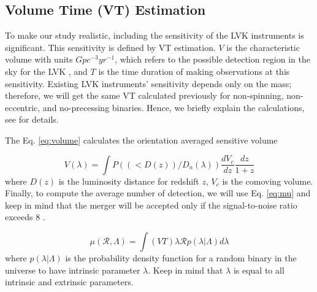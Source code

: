 \documentclass[twocolumn,prd,nofootinbib]{revtex4}
\begin{document}

\subsection{Volume Time (VT) Estimation}

To make our study realistic, including the sensitivity of the LVK instruments is significant. This sensitivity is defined by VT estimation. $V$ is the characteristic volume with units $Gpc^{-3}yr^{-1}$, which refers to the possible detection region in the sky for the LVK \cite{Volume_1993}, and $T$ is the time duration of making observations at this sensitivity.
Existing LVK instruments' sensitivity depends only on the mass; therefore, we will get the same VT calculated previously \cite{Dan_2019} for non-spinning, non-eccentric, and no-precessing binaries. Hence, we briefly explain the calculations, see \cite{Dan_2019} for details.

The Eq. \ref{eq:volume} calculates the orientation averaged sensitive volume \cite{Abbott_2016,richard2010volume}

\begin{equation}
\label{eq:volume}
V(\lambda) = \int P((<D(z))/D_n(\lambda))\frac{dV_c}{dz}\frac{dz}{1+z}
\end{equation}    
where $D(z)$ is the luminosity distance for redshift $z$, $V_c$ is the comoving volume. Finally, to compute the average number of detection, we will use Eq. \ref{eq:mu} and keep in mind that the merger will be accepted only if the signal-to-noise ratio exceeds 8 \cite{SNR_2010}.

\begin{equation}
\label{eq:mu}
  \mu(\mathcal{R},\Lambda) = \int(VT)\lambda \mathcal{R}p(\lambda|\Lambda)d\lambda  
\end{equation}
where $p(\lambda|\Lambda)$ is the probability density function for a random binary in the universe to have intrinsic parameter $\lambda$. Keep in mind that $\lambda$ is equal to all intrinsic and extrinsic parameters.

\end{document}
